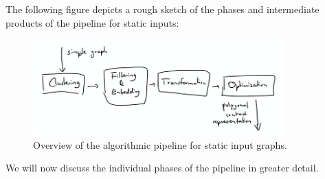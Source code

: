 The following figure depicts a rough sketch of the phases and intermediate products of the pipeline for static inputs:

\begin{figure}[H]
	\centering\includegraphics[height=140px]{Resources/Pipeline-Static.png}
	\caption{Overview of the algorithmic pipeline for static input graphs.}
	\label{fig:pipeline-static}
\end{figure}

We will now discuss the individual phases of the pipeline in greater detail.

\clearpage

\clearpage

\clearpage

\clearpage

